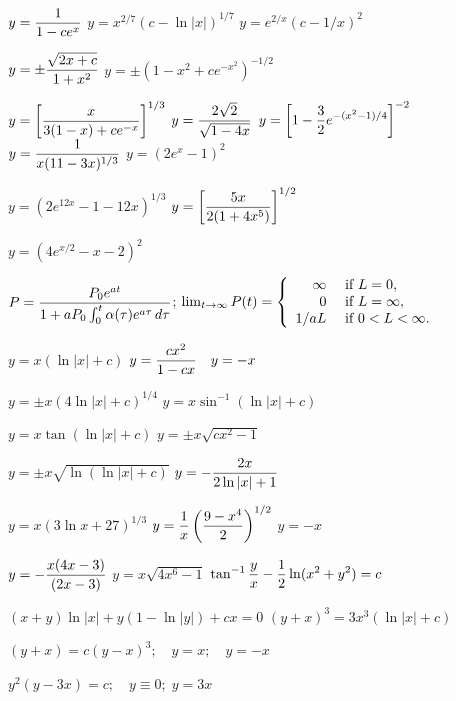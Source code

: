 \medskip

 $y=\displaystyle\frac{1}{1-ce^{x}}$
 $y=x^{2/7}(c-\ln|x|)^{1/7}$
 $y=e^{2/x}(c-1/x)^{2}$

 $y=\pm\displaystyle{\frac{\sqrt{2x+c}}{1+x^{2}}}$
 $y=\pm(1-x^{2}+ce^{-x^{2}})^{-1/2}$

 $y=\displaystyle{\left[\frac{x}{3(1-x)+ce^{-x}}\right]^{1/3}}$
 $y=\displaystyle\frac{2\sqrt{2}}{\sqrt{1-4x}}$
$y=\displaystyle{\left[1-\frac{3}{2}e^{-(x^{2}-1)/4}\right]^{-2}}$
 $y=\displaystyle\frac{1}{x(11-3x)^{1/3}}$
 $y=(2e^{x}-1)^{2}$

 $y=(2e^{12x}-1-12x)^{1/3}$
 $y=\displaystyle{\left[\frac{5x}{2(1+4x^{5})}\right]^{1/2}}$

 $y=(4e^{x/2}-x-2)^{2}$

$P=\displaystyle\frac{P_{0}e^{at}}{1+aP_{0}\int_{0}^{t}\alpha(\tau)e^{a\tau}\,d\tau}$;\quad
 $\lim_{t\to\infty}P(t)=
\displaystyle{\left\{\begin{array}{rl}\infty&\mbox{ if }L=0,\\0&\mbox{ if
}L=\infty,\\1/aL&\mbox{ if }0<L<\infty.\end{array}\right.}$

   $y=x(\ln|x|+c)$
$y=\displaystyle\frac{cx^{2}}{1-cx}\quad y=-x$

   $y=\pm x(4\ln|x|+c)^{1/4}$
   $y=x\sin^{-1}(\ln|x|+c)$

   $y=x\tan(\ln|x|+c)$
 $y=\pm x\sqrt{cx^{2}-1}$

   $y=\pm x\sqrt{\ln(\ln|x|+c)}$
   $y=-\displaystyle\frac{2x}{2\ln|x|+1}$

  $y=x(3\ln x+27)^{1/3}$
  $y=\displaystyle{\frac{1}{x}\left(\frac{9-x^{4}}{2}\right)^{1/2}}$
 $y=-x$

  $y=-\displaystyle\frac{x(4x-3)}{(2x-3)}$
   $y=x\sqrt{4x^{6}-1}$
   $\displaystyle{\tan^{-1}
\frac{y}{x}-\frac{1}{2}\ln(x^{2}+y^{2})=c}$

  $(x+y)\ln|x|+y(1-\ln|y|)+cx=0$
   $(y+x)^{3}=3x^{3}(\ln|x|+c)$

 $(y+x)=c(y-x)^{3};\quad y=x;\quad y=-x$

$y^{2}(y-3x)=c;\quad y\equiv0;\;y=3x$

